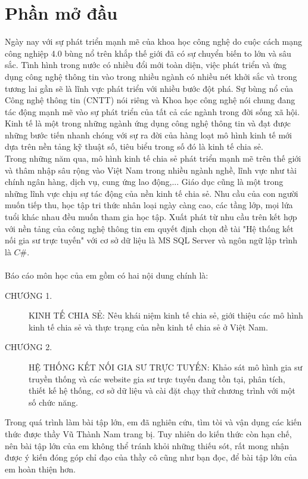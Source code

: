\documentclass[12pt,a4paper]{report}
\begin{document}
\chapter*{Phần mở đầu}
Ngày nay với sự phát triển mạnh mẽ của khoa học công nghệ do cuộc cách mạng công nghiệp 4.0 bùng nổ trên khắp thế giới đã có sự chuyển biến to lớn và sâu sắc. Tình hình trong nước có nhiều đổi mới toàn diện, việc phát triển và ứng dụng công nghệ thông tin vào trong nhiều ngành có nhiều nét khởi sắc và trong tương lai gần sẽ là lĩnh vực phát triển với nhiều bước đột phá. Sự bùng nổ của Công nghệ thông tin (CNTT) nói riêng và Khoa học công nghệ nói chung đang tác động mạnh mẽ vào sự phát triển của tất cả các ngành trong đời sống xã hội. Kinh tế là một trong những ngành ứng dụng công nghệ thông tin và đạt được những bước tiến nhanh chóng với sự ra đời của hàng loạt mô hình kinh tế mới dựa trên nền tảng kỹ thuật số, tiêu biểu trong số đó là kinh tế chia sẻ.\\

Trong những năm qua, mô hình kinh tế chia sẻ phát triển mạnh mẽ trên thế giới và thâm nhập sâu rộng vào Việt Nam trong nhiều ngành nghề, lĩnh vực như tài chính ngân hàng, dịch vụ, cung ứng lao động,... Giáo dục cũng là một trong những lĩnh vực chịu sự tác động của nền kinh tế chia sẻ. Nhu cầu của con người muốn tiếp thu, học tập tri thức nhân loại ngày càng cao, các tầng lớp, mọi lứa tuổi khác nhau đều muốn tham gia học tập. Xuất phát từ nhu cầu trên kết hợp với nền tảng của công nghệ thông tin em quyết định chọn đề tài "Hệ thống kết nối gia sư trực tuyến" với cơ sở dữ liệu là MS SQL Server và ngôn ngữ lập trình là $C\#$.\\\\
Báo cáo môn học của em gồm có hai nội dung chính là:
\begin{description}
\item[CHƯƠNG 1.]KINH TẾ CHIA SẺ: Nêu khái niệm kinh tế chia sẻ, giới thiệu các mô hình kinh tế chia sẻ và thực trạng của nền kinh tế chia sẻ ở Việt Nam.
\item[CHƯƠNG 2.]HỆ THỐNG KẾT NỐI GIA SƯ TRỰC TUYẾN: Khảo sát mô hình gia sư truyền thống và các website gia sư trực tuyến đang tồn tại, phân tích, thiết kế hệ thống, cơ sở dữ liệu và cài đặt chạy thử chương trình với một số chức năng.
\end{description}

Trong quá trình làm bài tập lớn, em đã nghiên cứu, tìm tòi và vận dụng các kiến thức được thầy Vũ Thành Nam trang bị. Tuy nhiên do kiến thức còn hạn chế, nên bài tập lớn của em không thể tránh khỏi những thiếu sót, rất mong nhận được ý kiến đóng góp chỉ đạo của  thầy cô cũng như bạn đọc, để bài tập lớn của em hoàn thiện hơn.\\
\end{document}
